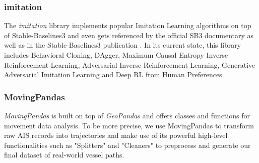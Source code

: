 \subsubsection{imitation}
The \textit{imitation} library \cite[]{wang2020imitation} implements popular Imitation Learning algorithms on top of Stable-Baselines3 and even gets referenced by the official SB3 documentary as well as in the Stable-Baselines3 publication \cite[p.~2]{stable-baselines3}. In its current state, this library includes Behavioral Cloning, DAgger, Maximum Causal Entropy Inverse Reinforcement Learning, Adversarial Inverse Reinforcement Learning, Generative Adversarial Imitation Learning and Deep RL from Human Preferences.

\subsubsection{MovingPandas}\label{subchap:movingPandas}
\textit{MovingPandas} \cite[]{graser2019movingpandas} is built on top of \textit{GeoPandas} \cite[]{kelsey_jordahl_2020_3946761} and offers classes and functions for movement data analysis. To be more precise, we use MovingPandas to transform raw AIS records into trajectories and make use of its powerful high-level functionalities such as "Splitters" and "Cleaners" to preprocess and generate our final dataset of real-world vessel paths.